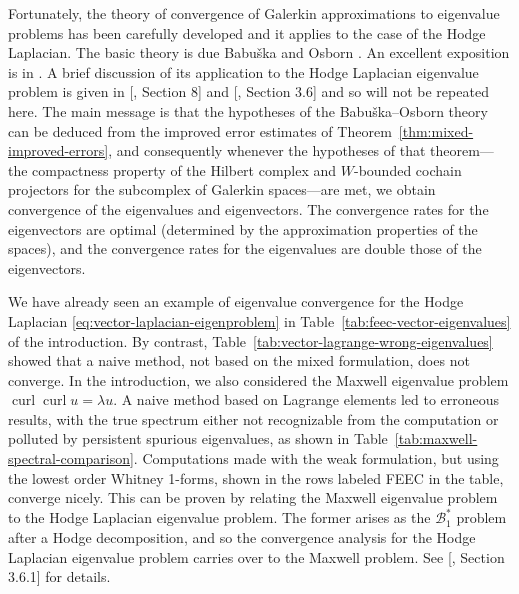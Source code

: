 {Fortunately, the theory of convergence of Galerkin approximations to eigenvalue problems has been carefully developed and it applies to the case of the Hodge Laplacian. The basic theory is due Babuška and Osborn . An excellent exposition is in . A brief discussion of its application to the Hodge Laplacian eigenvalue problem is given in [, Section 8] and [, Section 3.6] and so will not be repeated here. The main message is that the hypotheses of the Babuška–Osborn theory can be deduced from the improved error estimates of Theorem~\ref{thm:mixed-improved-errors}, and consequently whenever the hypotheses of that theorem---the compactness property of the Hilbert complex and $W$-bounded cochain projectors for the subcomplex of Galerkin spaces---are met, we obtain convergence of the eigenvalues and eigenvectors. The convergence rates for the eigenvectors are optimal (determined by the approximation properties of the spaces), and the convergence rates for the eigenvalues are double those of the eigenvectors.}

{We have already seen an example of eigenvalue convergence for the Hodge Laplacian \eqref{eq:vector-laplacian-eigenproblem} in Table~\ref{tab:feec-vector-eigenvalues} of the introduction. By contrast, Table~\ref{tab:vector-lagrange-wrong-eigenvalues} showed that a naive method, not based on the mixed formulation, does not converge. In the introduction, we also considered the Maxwell eigenvalue problem $\operatorname{curl}\operatorname{curl}u=\lambda u$. A naive method based on Lagrange elements led to erroneous results, with the true spectrum either not recognizable from the computation or polluted by persistent spurious eigenvalues, as shown in Table~\ref{tab:maxwell-spectral-comparison}. Computations made with the weak formulation, but using the lowest order Whitney 1-forms, shown in the rows labeled FEEC in the table, converge nicely. This can be proven by relating the Maxwell eigenvalue problem to the Hodge Laplacian eigenvalue problem. The former arises as the $\mathcal B_1^*$ problem after a Hodge decomposition, and so the convergence analysis for the Hodge Laplacian eigenvalue problem carries over to the Maxwell problem. See [, Section 3.6.1] for details.}
